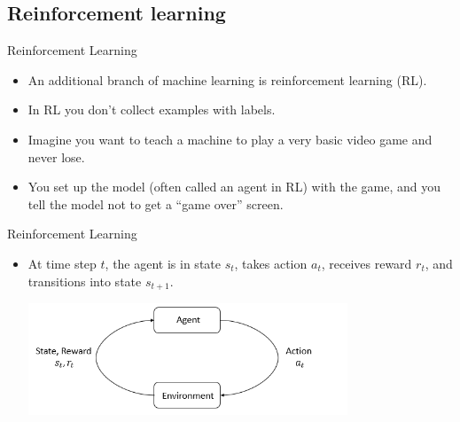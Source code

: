 \documentclass{beamer}
\begin{document}









\subsection{Reinforcement learning}

\begin{frame}{Reinforcement Learning}

\begin{itemize}
\item An additional branch of machine learning is reinforcement learning (RL). 

\item In RL you don't collect examples with labels. 

\item Imagine you want to teach a machine to play a very basic video game and never lose. 

\item You set up the model (often called an agent in RL) with the game, and you tell the model not to get a ``game over'' screen. 
\end{itemize}
\end{frame}

\begin{frame}{Reinforcement Learning}

\begin{itemize}

\item At time step $t$, the agent is in state $s_t$, takes action $a_t$, receives reward $r_t$, and transitions into state $s_{t+1}$.

\bigskip
\includegraphics[width=0.75\textwidth]{images/rl_diagram_transparent_bg.png}
\end{itemize}
\end{frame}
\end{document}

